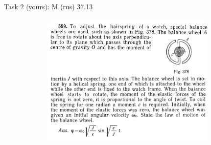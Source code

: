 \documentclass[aspectratio=169]{beamer}
\newcommand{\fbckg}[1]{\usebackgroundtemplate{\texttt{[image: \#1]}}}%
\begin{document}
\begin{frame}[t]{Task 2 (yours): M (rus) 37.13    }
\framesubtitle{}
    \vspace{-0.6cm}
    \begin{figure}[H]
        \centering\includegraphics[height=6.5cm,width=1\textwidth,keepaspectratio]{image11.png}
        \label{fig:image11}
    \end{figure}
\end{frame}

\fbckg{fibeamer/figs/last_page.png}
\frame[plain]{}
\end{document}
